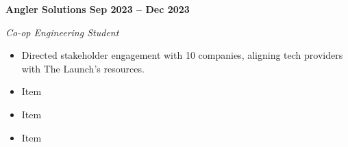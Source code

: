 \vspace{0.1cm}
\textbf{Angler Solutions \hfill Sep 2023 -- Dec 2023} \par
\textit{Co-op Engineering Student} \par
\begin{itemize}
	\item Directed stakeholder engagement with 10 companies, aligning tech providers with The Launch’s resources.
  \item Item
  \item Item
  \item Item
\end{itemize} \par